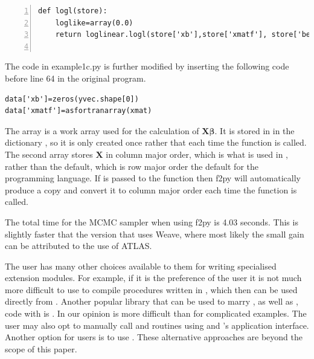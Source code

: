\documentclass[article]{jss}
\begin{document}
\begin{lstlisting}[basicstyle={\scriptsize},numbers=left]
def logl(store):
	loglike=array(0.0)     
	return loglinear.logl(store['xb'],store['xmatf'], store['beta'],store['yvec'],loglike)
    
\end{lstlisting}


The code in example1c.py is further modified by inserting the
following code before line 64 in the original program.


\begin{lstlisting}[basicstyle={\scriptsize}]
data['xb']=zeros(yvec.shape[0])
data['xmatf']=asfortranarray(xmat)
\end{lstlisting}


The array  is a work array used for the
calculation of $\bm{X}\bm{\beta}.$ It is stored in in the
 dictionary , so it is only created once
rather that each time the function  is called. The second
array  stores $\bm{X}$ in column major order,
which is what is used in , rather than the
 default, which is row major order the default for
the  programming language. If  is
passed to the function  then f2py will
automatically produce a copy and convert it to column major order each
time the function  is called.

The total time for the MCMC sampler when using f2py is 4.03 seconds.
This is slightly faster that the version that uses Weave, where most
likely the small gain can be attributed to the use of ATLAS.

The user has many other choices available to them for writing
specialised extension modules. For example, if it is the preference of
the user it is not much more difficult to use  to compile
procedures written in , which then can be used directly
from . Another popular library that can be used to
marry , as well as , code with
 is . In our opinion  is more
difficult than  for complicated examples. The user may also
opt to manually call  and  routines using
 and 's  application
interface. Another option for  users is to use
 . These alternative approaches are beyond
the scope of this paper.
\end{document}
